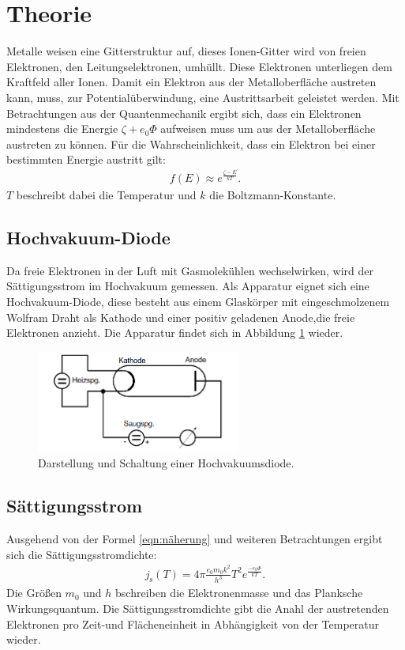 \section{Theorie}
\label{sec:Theorie}
Metalle weisen eine Gitterstruktur auf, dieses Ionen-Gitter wird von freien Elektronen, den Leitungselektronen,
umhüllt. Diese Elektronen unterliegen dem Kraftfeld aller Ionen.
Damit ein Elektron aus der Metalloberfläche austreten kann, muss, zur Potentialüberwindung, eine
Austrittsarbeit geleistet werden. Mit Betrachtungen aus der Quantenmechanik ergibt sich, dass
ein Elektronen mindestens die Energie $\zeta+e_\mathrm{0}\Phi$ aufweisen muss um aus der Metalloberfläche
austreten zu können. Für die Wahrscheinlichkeit, dass ein Elektron bei einer bestimmten Energie austritt gilt:
\begin{align}
f(E)\approx e^{\frac{\zeta-E}{kT}}\label{eqn:naeherung}.
\end{align}
$T$ beschreibt dabei die Temperatur und $k$ die Boltzmann-Konstante.

\subsection{Hochvakuum-Diode}
Da freie Elektronen in der Luft mit Gasmolekühlen wechselwirken, wird der Sättigungsstrom im Hochvakuum gemessen.
Als Apparatur eignet sich eine Hochvakuum-Diode, diese besteht aus einem Glaskörper mit eingeschmolzenem Wolfram
Draht als Kathode und einer positiv geladenen Anode,die freie Elektronen anzieht.
Die Apparatur findet sich in Abbildung \ref{fig:aufbau} wieder.
\begin{figure}
 \centering
 \includegraphics[width=0.6\textwidth]{aufbau.png}
 \caption{Darstellung und Schaltung einer Hochvakuumsdiode.\cite{sample}}
 \label{fig:aufbau}
 \end{figure}

\subsection{Sättigungsstrom}
Ausgehend von der Formel \eqref{eqn:näherung} und weiteren Betrachtungen ergibt sich
die Sättigungsstromdichte:
\begin{align}
j_\mathrm{s}(T)=4\pi\frac{e_\mathrm{0} m_\mathrm{0} k^2}{h^3} T^2 e^{\frac{-e_\mathrm{0}\Phi}{kT}} \label{eqn:st}.
\end{align}
Die Größen $m_\mathrm{0}$ und $h$ bschreiben die Elektronenmasse und das Planksche Wirkungsquantum.
Die Sättigungsstromdichte gibt die Anahl der austretenden Elektronen pro Zeit-und Flächeneinheit
in Abhängigkeit von der Temperatur wieder.


